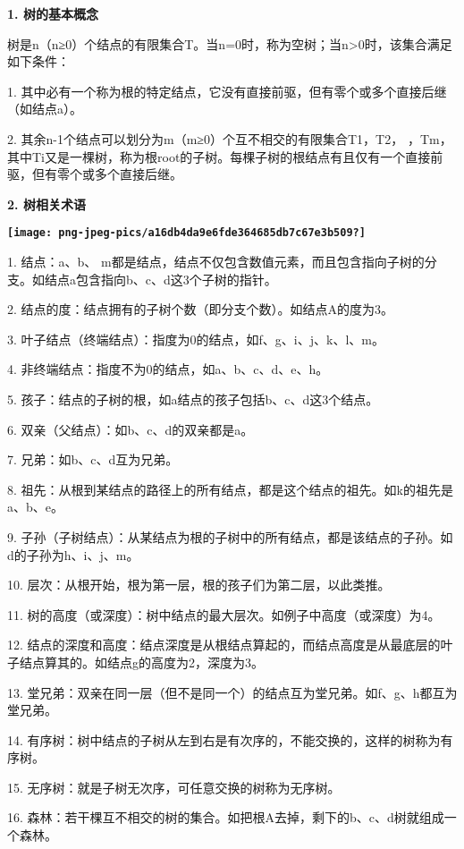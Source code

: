 {\textbf{1. 树的基本概念}}

树是n（n≥0）个结点的有限集合T。当n=0时，称为空树；当n\textgreater{}0时，该集合满足如下条件：

{1.
其中{必有一个称为根的特定结点}，它没有直接前驱，但有零个或多个直接后继（如结点a）。}

{2. 其余n-1个结点可以划分为m（m≥0）个互不相交的有限集合T1，T2，
，Tm，其中Ti又是一棵树，称为根root的子树。每棵子树的根结点有且仅有一个直接前驱，但有零个或多个直接后继。}

{\textbf{2. 树相关术语}}

{\textbf{\texttt{[image: png-jpeg-pics/a16db4da9e6fde364685db7c67e3b509?]}\\
}}

{1. 结点：a、b、
m都是结点，结点不仅包含数值元素，而且包含指向子树的分支。如结点a包含指向b、c、d这3个子树的指针。}

{2. 结点的度：结点拥有的子树个数（即分支个数）。如结点A的度为3。}

{3. 叶子结点（终端结点）：指度为0的结点，如f、g、i、j、k、l、m。}

{4. 非终端结点：指度不为0的结点，如a、b、c、d、e、h。}

{5. 孩子：结点的子树的根，如a结点的孩子包括b、c、d这3个结点。}

{6. 双亲（父结点）：如b、c、d的双亲都是a。}

{7. 兄弟：如b、c、d互为兄弟。}

{8.
祖先：从根到某结点的路径上的所有结点，都是这个结点的祖先。如k的祖先是a、b、e。}

{9.
子孙（子树结点）：从某结点为根的子树中的所有结点，都是该结点的子孙。如d的子孙为h、i、j、m。}

{10. 层次：从根开始，根为第一层，根的孩子们为第二层，以此类推。}

{11.
树的高度（或深度）：树中结点的最大层次。如例子中高度（或深度）为4。}

{12.
结点的深度和高度：结点深度是从根结点算起的，而结点高度是从最底层的}{叶子结点算其的。如结点g的高度为2，深度为3。}

{13.
堂兄弟：双亲在同一层（但不是同一个）的结点互为堂兄弟。如f、g、h都互为堂兄弟。}

{14.
有序树：树中结点的子树从左到右是有次序的，不能交换的，这样的树称为有序树。}

{15. 无序树：就是子树无次序，可任意交换的树称为无序树。}

{16.
森林：若干棵互不相交的树的集合。如把根A去掉，剩下的b、c、d树就组成一个森林。}
